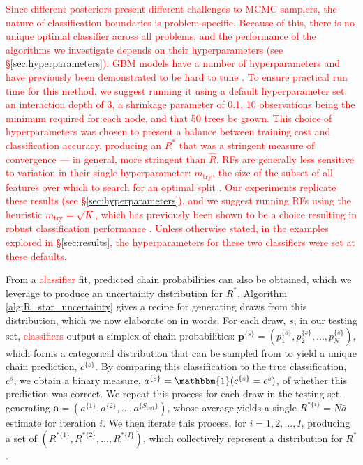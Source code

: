 \documentclass{article}
\begin{document}
\textcolor{red}{Since different posteriors present different challenges to MCMC samplers, the nature of classification boundaries is problem-specific. Because of this, there is no unique optimal classifier across all problems, and the performance of the algorithms we investigate depends on their hyperparameters (see \S\ref{sec:hyperparameters}). GBM models have a number of hyperparameters and have previously been demonstrated to be hard to tune \cite[Chapter~12]{boehmke2019hands}. To ensure practical run time for this method, we suggest running it using a default hyperparameter set: an interaction depth of 3, a shrinkage parameter of 0.1, 10 observations being the minimum required for each node, and that 50 trees be grown. This choice of hyperparameters was chosen to present a balance between training cost and classification accuracy, producing an $R^*$  that was a stringent measure of convergence — in general, more stringent than $\widehat{R}$. RFs are generally less sensitive to variation in their single hyperparameter: $m_{\text{try}}$, the size of the subset of all features over which to search for an optimal split \cite[Chapter~11]{boehmke2019hands}. Our experiments replicate these results (see \S\ref{sec:hyperparameters}), and we suggest running RFs using the heuristic $m_{\text{try}}=\sqrt{K}$, which has previously been shown to be a choice resulting in robust classification performance \citep{bernard2009influence,boehmke2019hands}. Unless otherwise stated, in the examples explored in \S\ref{sec:results}, the hyperparameters for these two classifiers were set at these defaults.}

From a \textcolor{red}{classifier} fit, predicted chain probabilities can also be obtained, which we leverage to produce an uncertainty distribution for $R^*$. Algorithm \ref{alg:R_star_uncertainty} gives a recipe for generating draws from this distribution, which we now elaborate on in words. For each draw, $s$, in our testing set, \textcolor{red}{classifiers} output a simplex of chain probabilities: $\boldsymbol{p}^{\{s\}}=(p_1^{\{s\}},p_2^{\{s\}},...,p_N^{\{s\}})$, which forms a categorical distribution that can be sampled from to yield a unique chain prediction, $c^{\{s\}}$. By comparing this classification to the true classification, $c^s$, we obtain a binary measure, $a^{\{s\}}=\mathbbm{1}(c^{\{s\}}=c^s)$, of whether this prediction was correct. We repeat this process for each draw in the testing set, generating $\boldsymbol{a}=(a^{\{1\}},a^{\{2\}},...,a^{\{S_\text{test}\}})$, whose average yields a single $R^{*\{i\}}=N \bar{a}$ estimate for iteration $i$. We then iterate this process, for $i=1,2,...,I$, producing a set of $(R^{*\{1\}},R^{*\{2\}},...,R^{*\{I\}})$, which collectively represent a distribution for $R^*$. 
\end{document}
